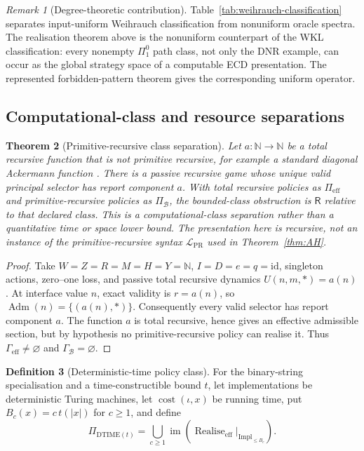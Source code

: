 \documentclass[11pt]{article}
\theoremstyle{plain}
\newtheorem{theorem}{Theorem}[section]
\theoremstyle{definition}
\newtheorem{definition}[theorem]{Definition}
\theoremstyle{remark}
\newtheorem{remark}[theorem]{Remark}
\newcommand{\N}{\mathbb{N}}
\newcommand{\im}{\operatorname{im}}
\newcommand{\Adm}{\operatorname{Adm}}
\newcommand{\realise}{\operatorname{Realise}}
\begin{document}
\begin{remark}[Degree-theoretic contribution]
Table~\ref{tab:weihrauch-classification} separates input-uniform Weihrauch
classification from nonuniform oracle spectra. The realisation theorem above is the nonuniform counterpart of the WKL
classification: every nonempty $\Pi^0_1$ path class, not only the DNR example,
can occur as the global strategy space of a computable ECD presentation. The
represented forbidden-pattern theorem gives the corresponding uniform operator.
\end{remark}


\subsection{Computational-class and resource separations}

\begin{theorem}[Primitive-recursive class separation]\label{thm:primitive-class-separation}
Let $a:\N\to\N$ be a total recursive function that is not primitive recursive,
for example a standard diagonal Ackermann function \cite{rogers}. There is a
passive recursive
game whose unique valid principal selector has report component $a$. With total recursive policies as
$\Pi_{\mathrm{eff}}$ and primitive-recursive policies as $\Pi_{\mathcal B}$,
the bounded-class obstruction is $\mathsf R$ relative to that declared class.
This is a computational-class separation rather than a quantitative time or
space lower bound. The presentation here is recursive, not an instance of the
primitive-recursive syntax $\mathcal L_{\mathrm{PR}}$ used in
Theorem~\ref{thm:AH}.
\end{theorem}

\begin{proof}
Take $W=Z=R=M=H=Y=\N$, $I=D=e=q=\mathrm{id}$, singleton actions, zero--one
loss, and passive total recursive dynamics
$U(n,m,\ast)=a(n)$. At interface value $n$, exact validity is
$r=a(n)$, so $\Adm(n)=\{(a(n),\ast)\}$. Consequently every valid selector has
report component $a$. The function $a$ is total recursive, hence gives an
effective admissible section, but by hypothesis no primitive-recursive policy
can realise it. Thus $\Gamma_{\mathrm{eff}}\ne\varnothing$ and
$\Gamma_{\mathcal B}=\varnothing$.
\end{proof}

\begin{definition}[Deterministic-time policy class]\label{def:dtime-class}
For the binary-string specialisation and a time-constructible bound $t$, let
implementations be deterministic Turing machines, let
$\operatorname{cost}(\iota,x)$ be running time, put
$B_c(x)=c\,t(|x|)$ for $c\ge1$, and define
\[
\Pi_{\mathrm{DTIME}(t)}
=\bigcup_{c\ge1}
\im\!\left(
\realise_{\mathrm{eff}}|_{\mathrm{Impl}_{\le B_c}}
\right).
\]
\end{definition}
\end{document}

